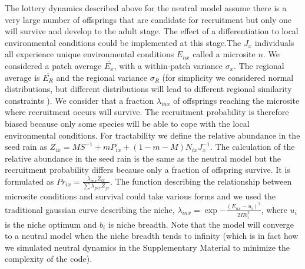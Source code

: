 \documentclass[12pt]{article}
\begin{document}
The lottery dynamics described above for the neutral model assume there is a very large number of offsprings that are candidate for recruitment but only one will survive and develop to the adult stage. The effect of a differentiation to local environmental conditions could be implemented at this stage.The $J_x$ individuals all experience unique environmental conditions $E_{nx}$ called a microsite $n$. We considered a patch average $\overline{E_x}$, with a within-patch variance $\sigma_x$. The regional average is $\overline{E_R}$ and the regional variance $\sigma_R$ (for simplicity we considered normal distributions, but different distributions will lead to different regional similarity constraints \parencite{Mouquet2003,Tilman2004,Gravel2006}). We consider that a fraction $\lambda_{inx}$ of offsprings reaching the microsite where recruitment occurs will survive. The recruitment probability is therefore biased because only some species will be able to cope with the local environmental conditions. For tractability we define the relative abundance in the seed rain as $Z_{ix} = MS^{-1} + mP_{ix} + (1-m-M)N_{ix}J_x^{-1}$. The calculation of the relative abundance in the seed rain is the same as the neutral model but the recruitment probability differs because only a fraction of offspring survive. It is formulated as $Pr_{ix} = \frac{\lambda_{inx}Z_{ix}}{\sum \lambda_{jnx}Z_{jx}}$. The function describing the relationship between microsite conditions and survival could take various forms and we used the traditional gaussian curve describing the niche, $\lambda_{inx} =  \exp{-\frac{(E_{nx}-u_i)^2}{2\Pi b_i^2}}$, where $u_i$ is the niche optimum and $b_i$ is niche breadth. Note that the model will converge to a neutral model when the niche breadth tends to infinity (which is in fact how we simulated neutral dynamics in the Supplementary Material to minimize the complexity of the code). 
\end{document}
